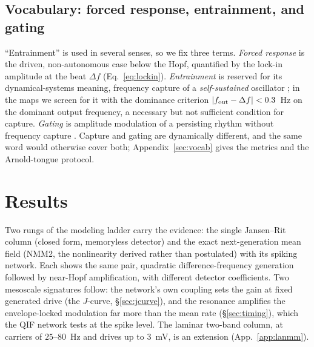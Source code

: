 \documentclass[11pt,a4paper]{article}
\begin{document}
\subsection{Vocabulary: forced response, entrainment, and gating}
``Entrainment'' is used in several senses, so we fix three terms. \emph{Forced response}
is the driven, non-autonomous case below the Hopf, quantified by the lock-in amplitude at
the beat $\Delta f$ (Eq.~\eqref{eq:lockin}). \emph{Entrainment} is reserved for its
dynamical-systems meaning, frequency capture of a \emph{self-sustained} oscillator
\cite{pikovsky2001}; in the maps we screen for it with the dominance criterion
$|f_{\rm out}-\Delta f|<0.3$~Hz on the dominant output frequency, a necessary but not
sufficient condition for capture. \emph{Gating} is amplitude modulation of a persisting rhythm without
frequency capture \cite{canolty2010,tort2010}. Capture and gating are dynamically different, and the same word would otherwise cover
both; Appendix~\ref{sec:vocab} gives the metrics and the Arnold-tongue protocol.

\section{Results}
Two rungs of the modeling ladder carry the evidence: the single Jansen--Rit column
(closed form, memoryless detector) and the exact next-generation mean field (NMM2, the
nonlinearity derived rather than postulated) with its spiking network. Each shows the same
pair, quadratic difference-frequency generation followed by near-Hopf amplification, with
different detector coefficients. Two mesoscale signatures follow: the network's own
coupling sets the gain at fixed generated drive (the $J$-curve, \S\ref{sec:jcurve}), and
the resonance amplifies the envelope-locked modulation far more than the mean rate
(\S\ref{sec:timing}), which the QIF network tests at the spike level. The laminar two-band
column, at carriers of $25$--$80$~Hz and drives up to $3$~mV, is an extension
(App.~\ref{app:lanmm}).
\end{document}
